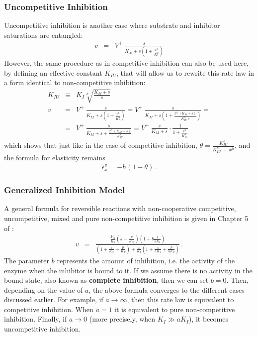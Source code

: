 \documentclass[12pt,a4paper]{article}
\begin{document}
\subsubsection{Uncompetitive Inhibition}
Uncompetitive inhibition is another case where substrate and inhibitor saturations are entangled:
\begin{eqnarray}
    v &=& V^+ ~ \frac{s}{K_M + s \left(1 + \frac{x^h}{K_I^h}\right)}
\end{eqnarray}
However, the same procedure as in competitive inhibition can also be used here, by defining an effective constant $K_{IU}$, that will allow us to rewrite this rate law in a form identical to non-competitive inhibition:
\begin{eqnarray}
    K_{IU} &\equiv& K_I \sqrt[h]{\frac{K_M + s}{s}} \nonumber\\
    v &=& V^+ ~ \frac{s}{K_M + s \left(1 + \frac{x^h}{K_I^h}\right)} =
          V^+ ~ \frac{s}{K_M + s \left(1 + \frac{x^h~(K_M + s)}{K_{IU}^h~s}\right)} = \nonumber\\
      &=& V^+ ~ \frac{s}{K_M + s + \frac{x^h~(K_M + s)}{K_{IU}^h}} = 
          V^+ ~ \frac{s}{K_M + s} \cdot \frac{1}{1 + \frac{x^h}{K_{IU}^h}}
\end{eqnarray}
which shows that just like in the case of competitive inhibition, $\theta = \frac{K_{IU}^h}{K_{IU}^h~+~x^h}$, and the formula for elasticity remains
\begin{eqnarray}
    \epsilon_x^v = -h(1 - \theta)\,. \label{eq:eps_uncomp_inh}
\end{eqnarray}

\subsubsection{Generalized Inhibition Model}
A general formula for reversible reactions with non-cooperative competitive, uncompetitive, mixed and pure non-competitive inhibition is given in Chapter 5 of \citet{Sauro2011-op}:
\begin{eqnarray}
    v &=& \frac{\frac{V_m}{K_S}\left(s - \frac{p}{K_{eq}}\right)\left(1 + b \frac{x}{aK_I}\right)}{\left(1 + \frac{s}{K_S} + \frac{p}{K_P}\right) + \frac{x}{K_I} \left(1 + \frac{s}{aK_S} + \frac{p}{aK_P}\right)}\,.
\end{eqnarray}
The parameter $b$ represents the amount of inhibition, i.e. the activity of the enzyme when the inhibitor is bound to it. If we assume there is no activity in the bound state, also known as \textbf{complete inhibition}, then we can set $b = 0$. 
Then, depending on the value of $a$, the above formula converges to the different cases discussed earlier. For example, if $a \rightarrow \infty$, then this rate law is equivalent to competitive inhibition. When $a = 1$ it is equivalent to pure non-competitive inhibition. Finally, if $a \rightarrow 0$ (more precisely, when $K_I \gg a K_I$), it becomes uncompetitive inhibition.
\end{document}
